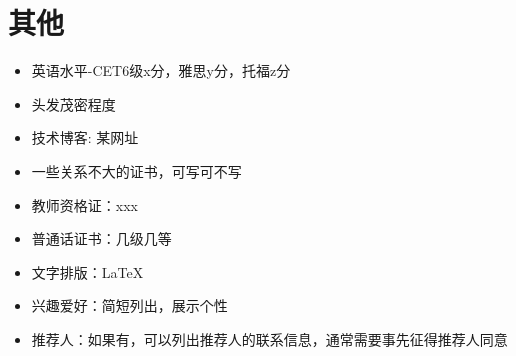 \documentclass[10pt]{article}
\begin{document}
    \section{\makebox[\widthof{\faInfo}][c]{\color{CQMU_Green}{\faInfo}}\quad 其他}
    \vspace{0.5em}
    \begin{itemize}
        \item 英语水平-CET6级x分，雅思y分，托福z分
        \item 头发茂密程度
        \item 技术博客: 某网址
        \item 一些关系不大的证书，可写可不写
        \item 教师资格证：xxx
        \item 普通话证书：几级几等
        \item 文字排版：\LaTeX
        \item 兴趣爱好：简短列出，展示个性
        \item 推荐人：如果有，可以列出推荐人的联系信息，通常需要事先征得推荐人同意
    \end{itemize}
\end{document}
